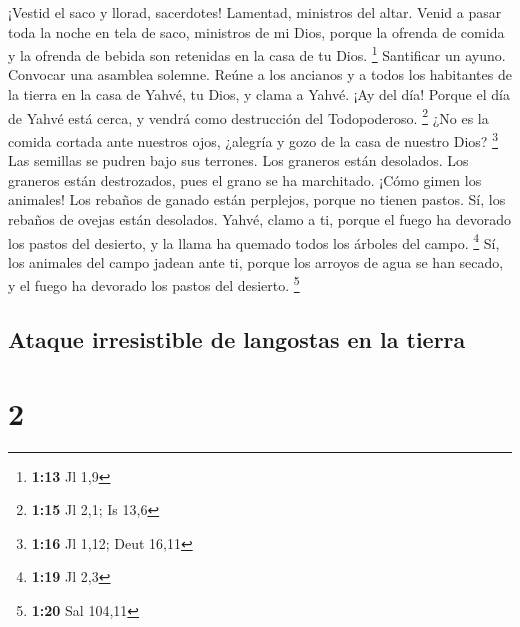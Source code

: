  ¡Vestid el saco y llorad, sacerdotes! Lamentad,
ministros del altar. Venid a pasar toda la noche en tela de saco,
ministros de mi Dios, porque la ofrenda de comida y la ofrenda de bebida
son retenidas en la casa de tu Dios. \footnote{\textbf{1:13} Jl 1,9}
 Santificar un ayuno. Convocar una asamblea solemne.
Reúne a los ancianos y a todos los habitantes de la tierra en la casa de
Yahvé, tu Dios, y clama a Yahvé.  ¡Ay del día! Porque el
día de Yahvé está cerca, y vendrá como destrucción del Todopoderoso.
\footnote{\textbf{1:15} Jl 2,1; Is 13,6}  ¿No es la
comida cortada ante nuestros ojos, ¿alegría y gozo de la casa de nuestro
Dios? \footnote{\textbf{1:16} Jl 1,12; Deut 16,11}  Las
semillas se pudren bajo sus terrones. Los graneros están desolados. Los
graneros están destrozados, pues el grano se ha marchitado.
 ¡Cómo gimen los animales! Los rebaños de ganado están
perplejos, porque no tienen pastos. Sí, los rebaños de ovejas están
desolados.  Yahvé, clamo a ti, porque el fuego ha
devorado los pastos del desierto, y la llama ha quemado todos los
árboles del campo. \footnote{\textbf{1:19} Jl 2,3}  Sí,
los animales del campo jadean ante ti, porque los arroyos de agua se han
secado, y el fuego ha devorado los pastos del desierto. \footnote{\textbf{1:20}
  Sal 104,11}

\hypertarget{ataque-irresistible-de-langostas-en-la-tierra}{%
\subsection{Ataque irresistible de langostas en la
tierra}\label{ataque-irresistible-de-langostas-en-la-tierra}}

\hypertarget{section-1}{%
\section{2}\label{section-1}}

